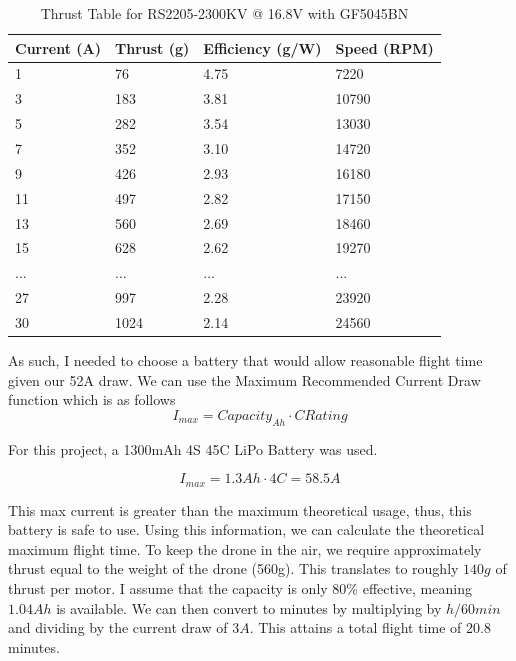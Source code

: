 \documentclass{article}
\begin{document}
\begin{table}[h!]
\centering
\begin{tabular}{|l|l|l|l|}
\hline
Current (A) & Thrust (g) & Efficiency (g/W) & Speed (RPM) \\ \hline
1           & 76         & 4.75             & 7220        \\ \hline
3           & 183        & 3.81             & 10790       \\ \hline
5           & 282        & 3.54             & 13030       \\ \hline
7           & 352        & 3.10             & 14720       \\ \hline
9           & 426        & 2.93             & 16180       \\ \hline
11          & 497        & 2.82             & 17150       \\ \hline
13          & 560        & 2.69             & 18460       \\ \hline
15          & 628        & 2.62             & 19270       \\ \hline
...         & ...        & ...              & ...         \\ \hline
27          & 997        & 2.28             & 23920       \\ \hline
30          & 1024       & 2.14             & 24560       \\ \hline
\end{tabular}
\caption{Thrust Table for RS2205-2300KV @ 16.8V with GF5045BN}
\end{table}

As such, I needed to choose a battery that would allow reasonable flight time given our 52A draw. We can use the Maximum Recommended Current Draw function which is as follows
\begin{equation}
I_{max} = Capacity_{Ah} \cdot C Rating
\end{equation}

For this project, a 1300mAh 4S 45C LiPo Battery was used. 

\[
I_{max} = 1.3Ah \cdot 4C = 58.5A
\]

This max current is greater than the maximum theoretical usage, thus, this battery is safe to use. Using this information, we can calculate the theoretical maximum flight time. To keep the drone in the air, we require approximately thrust equal to the weight of the drone (560g). This translates to roughly $140g$ of thrust per motor. I assume that the capacity is only 80\% effective, meaning $1.04Ah$ is available. We can then convert to minutes by multiplying by $h/60min$ and dividing by the current draw of $3A$. This attains a total flight time of 20.8 minutes.  
\end{document}
